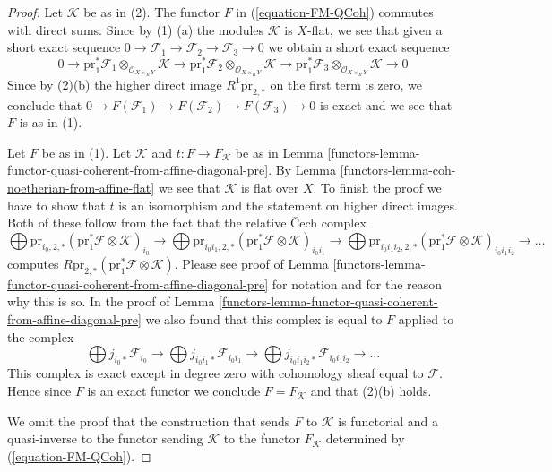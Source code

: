 \begin{proof}

Let $\mathcal{K}$ be as in (2). The functor $F$ in
(\ref{equation-FM-QCoh}) commutes with direct sums.
Since by (1) (a) the modules $\mathcal{K}$ is $X$-flat,
we see that given a short exact
sequence $0 \to \mathcal{F}_1 \to \mathcal{F}_2 \to \mathcal{F}_3 \to 0$
we obtain a short exact sequence
$$
0 \to
\text{pr}_1^*\mathcal{F}_1 \otimes_{\mathcal{O}_{X \times_R Y}} \mathcal{K} \to
\text{pr}_1^*\mathcal{F}_2 \otimes_{\mathcal{O}_{X \times_R Y}} \mathcal{K} \to
\text{pr}_1^*\mathcal{F}_3 \otimes_{\mathcal{O}_{X \times_R Y}} \mathcal{K} \to
0
$$
Since by (2)(b) the higher direct image $R^1\text{pr}_{2, *}$
on the first term is zero, we conclude that
$0 \to F(\mathcal{F}_1) \to F(\mathcal{F}_2) \to F(\mathcal{F}_3) \to 0$
is exact and we see that $F$ is as in (1).

\medskip\noindent
Let $F$ be as in (1). Let $\mathcal{K}$ and $t : F \to F_\mathcal{K}$ be as
in Lemma \ref{functors-lemma-functor-quasi-coherent-from-affine-diagonal-pre}.
By Lemma \ref{functors-lemma-coh-noetherian-from-affine-flat} we see
that $\mathcal{K}$ is flat over $X$. To finish the proof we have
to show that $t$ is an isomorphism and the statement on higher
direct images. Both of these follow from the fact that the
relative {\v C}ech complex
$$
\bigoplus
\text{pr}_{i_0, 2, *}
(\text{pr}_1^*\mathcal{F} \otimes \mathcal{K})_{i_0}
\to
\bigoplus
\text{pr}_{i_0i_1, 2, *}
(\text{pr}_1^*\mathcal{F} \otimes \mathcal{K})_{i_0i_1}
\to
\bigoplus
\text{pr}_{i_0i_1i_2, 2, *}
(\text{pr}_1^*\mathcal{F} \otimes \mathcal{K})_{i_0i_1i_2}
\to \ldots
$$
computes $R\text{pr}_{2, *}(\text{pr}_1^*\mathcal{F} \otimes \mathcal{K})$.
Please see proof of
Lemma \ref{functors-lemma-functor-quasi-coherent-from-affine-diagonal-pre}
for notation and for the reason why this is so. In the proof of
Lemma \ref{functors-lemma-functor-quasi-coherent-from-affine-diagonal-pre}
we also found that this complex is equal to $F$ applied to the complex
$$
\bigoplus j_{i_0*}\mathcal{F}_{i_0} \to
\bigoplus j_{i_0i_1*}\mathcal{F}_{i_0i_1} \to
\bigoplus j_{i_0i_1i_2*}\mathcal{F}_{i_0i_1i_2} \to \ldots
$$
This complex is exact except in degree zero with cohomology
sheaf equal to $\mathcal{F}$. Hence since $F$ is an exact functor
we conclude $F = F_\mathcal{K}$ and that (2)(b) holds.

\medskip\noindent
We omit the proof that the construction that sends $F$ to
$\mathcal{K}$ is functorial and a quasi-inverse to the
functor sending $\mathcal{K}$ to the functor $F_\mathcal{K}$
determined by (\ref{equation-FM-QCoh}).
\end{proof}

